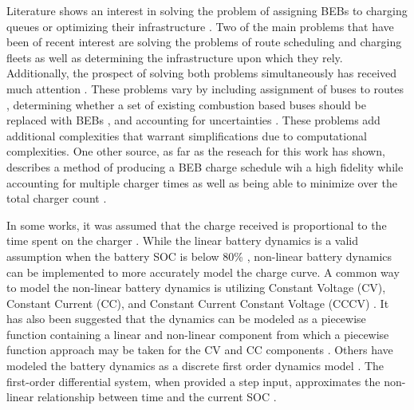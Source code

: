 \documentclass[11pt,a4paper,final]{article}
\begin{document}
Literature shows an interest in solving the problem of assigning BEBs to charging queues or optimizing their
infrastructure \cite{wei-2018-optim-spatio,sebastiani-2016-evaluat-elect,hoke-2014-accoun-lithium,wang-2017-elect-vehic}. Two of the main problems that have been of recent interest are
solving the problems of route scheduling and charging fleets as well as determining the infrastructure upon which they
rely. Additionally, the prospect of solving both problems simultaneously has received much attention
\cite{wei-2018-optim-spatio,sebastiani-2016-evaluat-elect,hoke-2014-accoun-lithium,wang-2017-elect-vehic}. These
problems vary by including assignment of buses to routes \cite{rinaldi-2020-mixed-fleet,zhou-2020-collab-optim,tang-2019-robus-sched,li-2014-trans-bus}, determining whether a set of existing combustion based buses should be
replaced with BEBs \cite{zhou-2020-bi-objec,duan-2021-refor-mixed,rinaldi-2020-mixed-fleet,zhou-2020-collab-optim}, and accounting for uncertainties \cite{bie-2021-optim-elect,duan-2021-refor-mixed,tang-2019-robus-sched,ursavas-2016-optim-polic}. These problems add additional complexities that warrant
simplifications due to computational complexities. One other source, as far as the reseach for this work has shown,
describes a method of producing a BEB charge schedule wih a high fidelity while accounting for multiple charger times as
well as being able to minimize over the total charger count \cite{whitaker-2023-a-network}.

In some works, it was assumed that the charge received is proportional to the time spent on the charger
\cite{liu-2020-batter-elect,yang-2018-charg-sched}. While the linear battery dynamics is a valid assumption when the
battery SOC is below 80\% \cite{liu-2020-batter-elect}, non-linear battery dynamics can be implemented to more
accurately model the charge curve. A common way to model the non-linear battery dynamics is utilizing Constant Voltage
(CV), Constant Current (CC), and Constant Current Constant Voltage (CCCV) \cite{abdollahi-2016-optim-batter,chen-2008-desig-grey}. It has also been suggested that the dynamics can be modeled as a piecewise function containing a
linear and non-linear component from which a piecewise function approach may be taken for the CV and CC components
\cite{zhang-2021-optim-elect,abdollahi-2016-optim-batter}. Others have modeled the battery dynamics as a discrete
first order dynamics model \cite{whitaker-2023-a-network}. The first-order differential system, when provided a step
input, approximates the non-linear relationship between time and the current SOC \cite{whitaker-2023-a-network}.
\end{document}
